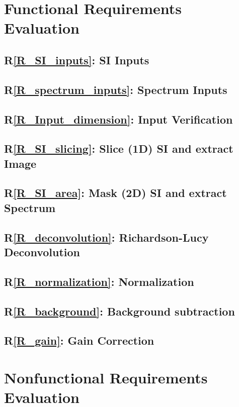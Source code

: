 \documentclass[12pt, titlepage]{article}
\newcommand{\rref}[1]{R\ref{#1}}
\begin{document}
\section{Functional Requirements Evaluation}
\subsection{\rref{R_SI_inputs}: SI Inputs}

\subsection{\rref{R_spectrum_inputs}: Spectrum Inputs}

\subsection{\rref{R_Input_dimension}: Input Verification}

\subsection{\rref{R_SI_slicing}: Slice (1D) SI and extract Image}

\subsection{\rref{R_SI_area}: Mask (2D) SI and extract Spectrum}

\subsection{\rref{R_deconvolution}: Richardson-Lucy Deconvolution}



\subsection{\rref{R_normalization}: Normalization}

\subsection{\rref{R_background}: Background subtraction}

\subsection{\rref{R_gain}: Gain Correction}

\section{Nonfunctional Requirements Evaluation}
\end{document}
